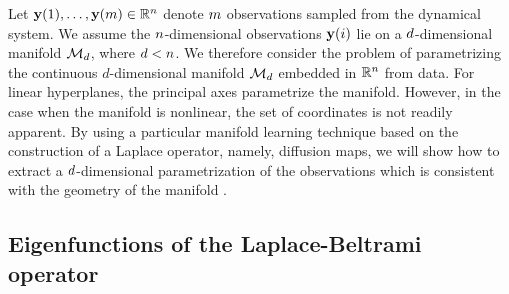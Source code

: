 Let $\mathbf{y}(1), \dots, \mathbf{y}(m) \in \mathbb{R}^n$ denote $m$ observations sampled from the dynamical system.
%
We assume the $n$-dimensional observations $\mathbf{y}(i)$ lie on a $d$-dimensional manifold $\mathcal{M}_d$, where $d < n$.
%
We therefore consider the problem of parametrizing the continuous $d$-dimensional manifold $\mathcal{M}_d$ embedded in $\mathbb{R}^n$ from data.
%
For linear hyperplanes, the principal axes parametrize the manifold.
%
However, in the case when the manifold is nonlinear, the set of coordinates is not readily apparent.
%
By using a particular manifold learning technique based on the construction of a Laplace operator, namely, diffusion maps, we will show how to extract a $d$-dimensional parametrization of the observations which is consistent with the geometry of the manifold \cite{Belkin2003, coifman2005geometric, singer2008non}.

\subsection{Eigenfunctions of the Laplace-Beltrami operator}

